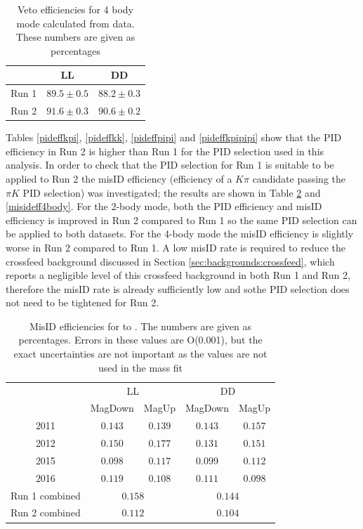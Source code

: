 \begin{table}
\centering
\begin{tabular}{ccc}
\hline
& LL & DD \\
\hline
Run 1 & $89.5 \pm 0.5$ & $88.2 \pm 0.3$ \\
Run 2 & $91.6 \pm 0.3$ & $90.6 \pm 0.2$ \\
\hline
\end{tabular}
\caption{Veto efficiencies for 4 body mode calculated from data. These numbers are given as percentages}
\label{vetoefficienciesdatak3pi}
\end{table}

Tables \ref{pideffkpi}, \ref{pideffkk}, \ref{pideffpipi} and \ref{pideffkpipipi} show that the PID efficiency in Run 2 is higher than Run 1 for the PID selection used in this analysis. In order to check that the PID selection for Run 1 is suitable to be applied to Run 2 the misID efficiency (efficiency of a $K\pi$ candidate passing the $\pi K$ PID selection) was investigated; the results are shown in Table \ref{misideff} and \ref{misideff4body}. For the 2-body mode, both the PID efficiency and misID efficiency is improved in Run 2 compared to Run 1 so the same PID selection can be applied to both datasets. For the 4-body mode the misID efficiency is slightly worse in Run 2 compared to Run 1. A low misID rate is required to reduce the crossfeed background discussed in Section \ref{sec:backgrounds:crossfeed}, which reports a negligible level of this crossfeed background in both Run 1 and Run 2, therefore the misID rate is already sufficiently low and  sothe PID selection does not need to be tightened for Run 2.

\begin{table}[h]
\centering
\begin{tabular}{c|cc|cc}
\hline
& \multicolumn{2}{c}{LL} & \multicolumn{2}{c}{DD} \\
& MagDown & MagUp & MagDown & MagUp \\
\hline
2011 & $0.143$ & $0.139$ & $0.143$ & $0.157$ \\
2012 & $0.150$ & $0.177$ & $0.131$ & $0.151$ \\
2015 & $0.098$ & $0.117$ & $0.099$ & $0.112$ \\
2016 & $0.119$ & $0.108$ & $0.111$ & $0.098$ \\
\hline
Run 1 combined & \multicolumn{2}{c}{$0.158$} & \multicolumn{2}{c}{$0.144$} \\
Run 2 combined & \multicolumn{2}{c}{$0.112$} & \multicolumn{2}{c}{$0.104$} \\
\hline
\end{tabular}
\caption{MisID efficiencies for \decay{\Dz}{\Km\pip} to \decay{\Dz}{\Kp\pim}. The numbers are given as percentages. Errors in these values are O(0.001), but the exact uncertainties are not important as the values are not used in the mass fit}
\label{misideff}
\end{table}

